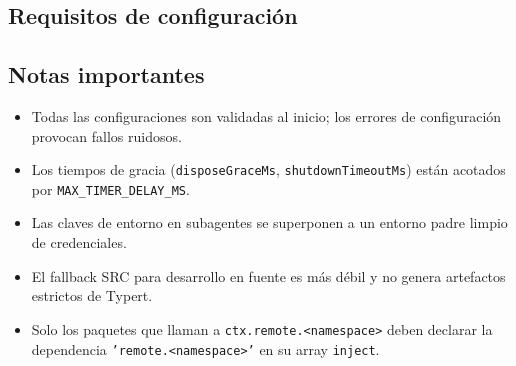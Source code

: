 \documentclass[11pt,a4paper]{article}
\begin{document}
\subsection*{Requisitos de configuración}




\subsection*{Notas importantes}


\begin{itemize}[leftmargin=*,topsep=2pt,itemsep=1pt]
  \item Todas las configuraciones son validadas al inicio; los errores de configuración provocan fallos ruidosos.
  \item Los tiempos de gracia (\texttt{disposeGraceMs}, \texttt{shutdownTimeoutMs}) están acotados por \texttt{MAX\_TIMER\_DELAY\_MS}.
  \item Las claves de entorno en subagentes se superponen a un entorno padre limpio de credenciales.
  \item El fallback SRC para desarrollo en fuente es más débil y no genera artefactos estrictos de Typert.
  \item Solo los paquetes que llaman a \texttt{ctx.remote.<namespace>} deben declarar la dependencia \texttt{'remote.<namespace>'} en su array \texttt{inject}.
\end{itemize}
\end{document}
